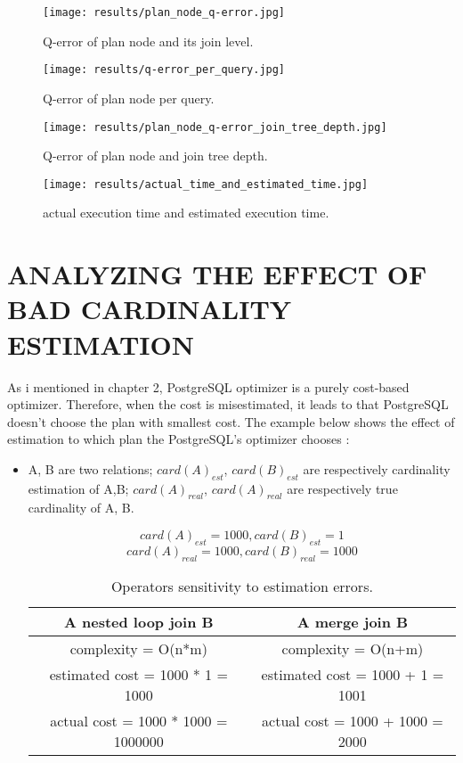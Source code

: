 \begin{figure}[H]
	\centering
	\texttt{[image: results/plan\_node\_q-error.jpg]}
	\caption{Q-error of plan node and its join level.}
\end{figure}

\begin{figure}[H]
	\centering
	\texttt{[image: results/q-error\_per\_query.jpg]}
	\caption{Q-error of plan node per query.}
\end{figure}

\begin{figure}[H]
	\centering
	\texttt{[image: results/plan\_node\_q-error\_join\_tree\_depth.jpg]}
	\caption{Q-error of plan node and join tree depth.}
\end{figure}

\begin{figure}[H]
	\centering
	\texttt{[image: results/actual\_time\_and\_estimated\_time.jpg]}
	\caption{actual execution time and estimated execution time.}
\end{figure}

\section{ANALYZING THE EFFECT OF BAD CARDINALITY ESTIMATION} 

As i mentioned in chapter 2, PostgreSQL optimizer is a purely cost-based optimizer. Therefore, when the cost is misestimated, it  leads to that PostgreSQL doesn't choose the plan with smallest cost. The example below shows the effect of estimation to which plan the PostgreSQL's optimizer chooses :
\begin{itemize}
	\item A, B are two relations; $card\left(A\right)_{est}$, $card\left(B\right)_{est}$ are 		respectively cardinality estimation of A,B; $card\left(A\right)_{real}$, $card					\left(A\right)_{real}$ are respectively true cardinality of A, B.
	
		\[
		card\left(A\right)_{est} = 1000, card\left(B\right)_{est} = 1
		\]
		\[
		card\left(A\right)_{real} = 1000, card\left(B\right)_{real} =  1000
		\]

\begin{table}[ht]
\begin{center}
\begin{tabular}{|c|c|}
	\hline
	A nested loop join B  & A merge join B\\
	\hline
	complexity = O(n*m) & complexity = O(n+m)\\
	\hline 
	estimated cost = 1000 * 1 = 1000 & estimated cost = 1000 + 1 = 1001\\ 
	\hline 
	actual cost = 1000 * 1000 = 1000000 & actual cost = 1000 + 1000 = 2000\\ 
	\hline 
\end{tabular}
\end{center}
\label{tab:dum1}
\caption{Operators sensitivity to estimation errors.}
\end{table}
\end{itemize}

